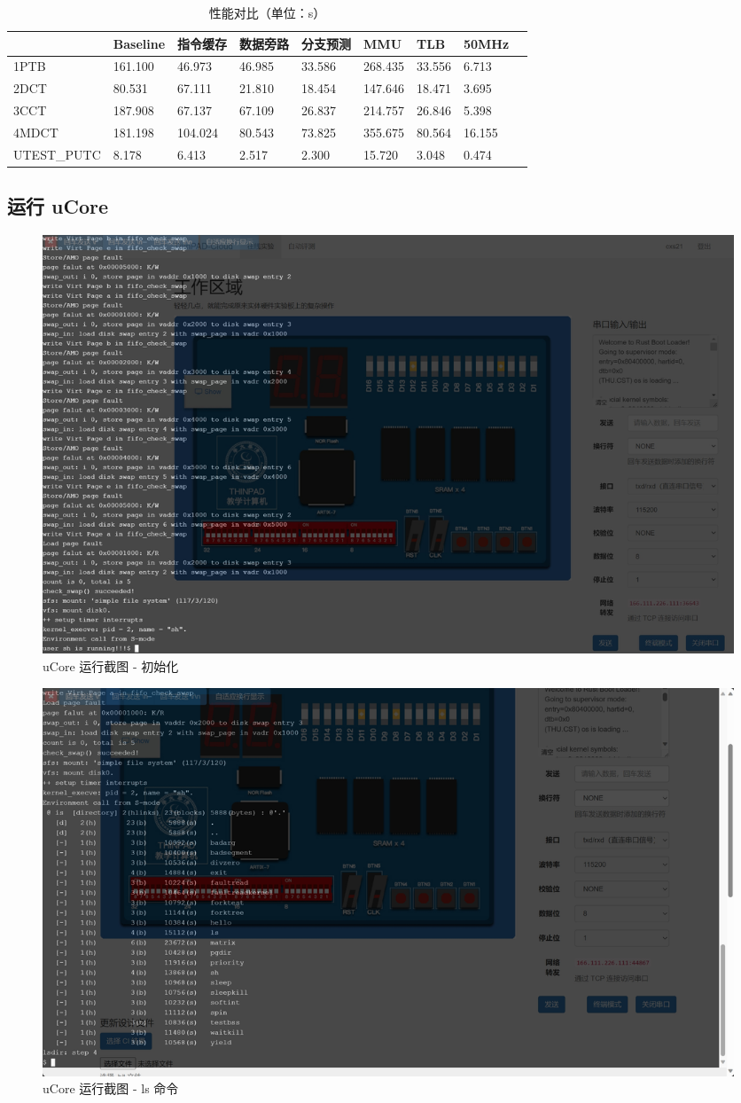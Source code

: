 \documentclass[12pt,a4paper,oneside]{ctexart}
\begin{document}
\begin{table}[H] \label{performance}
\caption{性能对比（单位：s）}
\begin{tabular}{lllllllll}
 & Baseline & 指令缓存 & 数据旁路 & 分支预测 & MMU & TLB & 50MHz \\
 \hline
1PTB & 161.100 & 46.973 & 46.985 & 33.586 & 268.435 & 33.556 & 6.713  \\
2DCT & 80.531 & 67.111 & 21.810 & 18.454 & 147.646 & 18.471 & 3.695  \\
3CCT & 187.908 & 67.137 & 67.109 & 26.837 & 214.757 & 26.846 & 5.398  \\
4MDCT & 181.198 & 104.024 & 80.543 & 73.825 & 355.675 & 80.564 & 16.155  \\
UTEST\_PUTC & 8.178 & 6.413 & 2.517 & 2.300 & 15.720 & 3.048 & 0.474
\end{tabular}
\end{table}

\subsection{运行 uCore}

\begin{figure}[H]
    \centering
    \includegraphics[scale=0.18]{assets/ucore_init.png}
    \caption{uCore 运行截图 - 初始化}
    \label{fig:uCore_init}
\end{figure}

\begin{figure}[H]
    \centering
    \includegraphics[scale=0.15]{assets/ucore_ls.png}
    \caption{uCore 运行截图 - ls 命令}
    \label{fig:ucore_ls}
\end{figure}
\end{document}

